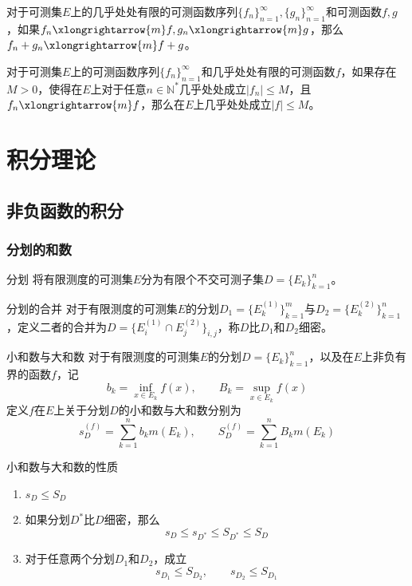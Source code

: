 \documentclass[lang = cn, scheme = chinese, thmcnt = section]{elegantbook}
\newcommand{\N}{\mathbb{N}}            %
\newcommand{\tom}{\xlongrightarrow{m}}
\begin{document}
\begin{exercise}
	对于可测集$E$上的几乎处处有限的可测函数序列$\{f_n\}_{n=1}^{\infty},\{g_n\}_{n=1}^{\infty}$和可测函数$f,g$，如果$f_n\tom f,g_n\tom g$，那么$f_n+g_n\tom f+g$。
\end{exercise}

\begin{exercise}
	对于可测集$E$上的可测函数序列$\{f_n\}_{n=1}^{\infty}$和几乎处处有限的可测函数$f$，如果存在$M>0$，使得在$E$上对于任意$n\in\N^*$几乎处处成立$|f_n|\le M$，且$f_n\tom f$，那么在$E$上几乎处处成立$|f|\le M$。
\end{exercise}

\chapter{积分理论}

\section{非负函数的积分}

\subsection{分划的和数}

\begin{definition}{分划}
	将有限测度的可测集$E$分为有限个不交可测子集$D=\{E_k\}_{k=1}^{n}$。
\end{definition}

\begin{definition}{分划的合并}
	对于有限测度的可测集$E$的分划$D_1=\{ E_k^{(1)} \}_{k=1}^{m}$与$D_2=\{ E_k^{(2)} \}_{k=1}^{n}$，定义二者的合并为$D=\{ E_i^{(1)}\cap E_j^{(2)} \}_{i,j}$，称$D$比$D_1$和$D_2$细密。
\end{definition}

\begin{definition}{小和数与大和数}
	对于有限测度的可测集$E$的分划$D=\{E_k\}_{k=1}^{n}$，以及在$E$上非负有界的函数$f$，记
	$$
	b_k=\inf_{x\in E_k}f(x),\qquad 
	B_k=\sup_{x\in E_k}f(x)
	$$
	定义$f$在$E$上关于分划$D$的小和数与大和数分别为
	$$
	s_D^{(f)}=\sum_{k=1}^{n}b_k m(E_k),\qquad
	S_D^{(f)}=\sum_{k=1}^{n}B_k m(E_k)
	$$
\end{definition}

\begin{proposition}{小和数与大和数的性质}
	\begin{enumerate}
		\item $s_D\le S_D$
		\item 如果分划$D^*$比$D$细密，那么
		$$
		s_D\le s_{D^*}\le S_{D^*}\le S_D
		$$
		\item 对于任意两个分划$D_1$和$D_2$，成立
		$$
		s_{D_1}\le S_{D_2},\qquad s_{D_2}\le S_{D_1}
		$$
	\end{enumerate}
\end{proposition}
\end{document}
